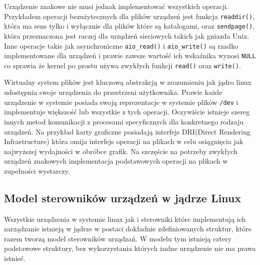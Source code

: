 \documentclass[10pt]{article}
\begin{document}
Urządzenie znakowe nie musi jednak implementować wszystkich operacji.  Przykładem operacji bezużytecznych dla plików urządzeń jest funkcja \texttt{readdir()}, która ma sens tylko i wyłącznie dla plików które są katalogami, oraz \texttt{sendpage()}, która przeznaczona jest raczej dla urządzeń sieciowych takich jak gniazda Unix. Inne operacje takie jak asynchroniczne \texttt{aio\_read()} i \texttt{aio\_write()} są rzadko implementowane dla urządzeń i prawie zawsze wartość ich wskaźnika wynosi \texttt{NULL} co sprawia że kernel po prostu używa zwykłych funkcji \texttt{read()} oraz \texttt{write()}.

Wirtualny system plików jest kluczową abstrakcją w zrozumieniu jak jądro linux udostępnia swoje urządzenia do przestrzeni użytkownika. Prawie każde urządzenie w systemie posiada swoją reprezentacje w systemie plików \texttt{/dev} i implementuje większość lub wszystkie z tych operacji. Oczywiście istnieje szereg innych metod komunikacji z procesami specyficznych dla konkretnego rodzaju urządzeń. Na przykład karty graficzne posiadają interfejs DRI(Direct Rendering Infrastructure) która omija interfejs operacji na plikach w celu osiągnięcia jak najwyższej wydajności w obróbce grafik. Na szczęście na potrzeby zwykłych urządzeń znakowych implementacja podstawowych operacji na plikach w zupełności wystarczy.

\subsection{Model sterowników urządzeń w jądrze Linux}
\label{linuxdrivermodel}

Wszystkie urządzenia w systemie linux jak i sterowniki które implementują ich zarządzanie istnieją w jądrze w postaci dokładnie zdefiniowanych struktur, które razem tworzą model sterowników urządzań.  W modelu tym istnieją cztery podstawowe struktury, bez wykorzystania których żadne urządzenie nie ma prawa istnieć.
\end{document}
